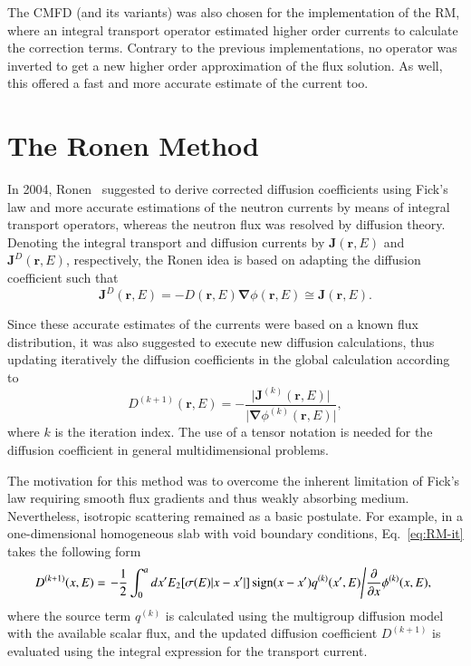 \documentclass[review,3p,onecolumn,sort&compress]{elsarticle}
\newcommand{\rr}{\bm{r}}
\newcommand{\rE}{\ensuremath{(\rr,E)}}
\newcommand{\bnabla}{\ensuremath{\bm{\nabla}}}
\begin{document}
The CMFD (and its variants) was also chosen for the implementation of the RM, where an integral transport operator estimated higher order currents to calculate the correction terms. Contrary to the previous implementations, no operator was inverted to get a new higher order approximation of the flux solution. As well, this offered a fast and more accurate estimate of the current too.


\section{The Ronen Method}
\label{sec:RM}

In 2004, Ronen~\cite{Ronen-2004} suggested to derive corrected diffusion coefficients using Fick's law and more accurate estimations of the neutron currents by means of integral transport operators, whereas the neutron flux was resolved by diffusion theory. Denoting the integral transport and diffusion currents by $\bm{J}\rE$ and $\bm{J}^D\rE$, respectively, the Ronen idea is based on adapting the diffusion coefficient such that
\begin{equation}
\label{eq:Fick}
\bm{J}^D\rE = -D\rE\bnabla\phi\rE \cong \bm{J}\rE.
\end{equation}

Since these accurate estimates of the currents were based on a known flux distribution, it was also suggested to execute new diffusion calculations, thus updating iteratively the diffusion coefficients in the global calculation according to
\begin{equation}
\label{eq:RM-it}
D^{(k+1)}\rE = - \frac{\lvert \bm{J}^{(k)}\rE \rvert}{\lvert \bnabla \phi^{(k)}\rE \rvert},
\end{equation}
where $k$ is the iteration index. The use of a tensor notation is needed for the diffusion coefficient in general multidimensional problems.

The motivation for this method was to overcome the inherent limitation of Fick's law requiring smooth flux gradients and thus weakly absorbing medium. Nevertheless, isotropic scattering remained as a basic postulate. For example, in a one-dimensional homogeneous slab with void boundary conditions, Eq.~\eqref{eq:RM-it} takes the following form~\cite{Ronen-2004}
\begin{equation}
\label{eq:RM-it-1D-slab}
D^{(k+1)}(x,E) = \left. -\frac{1}{2} \int_0^a dx'
{E_2[\sigma(E) \lvert x-x' \rvert]\operatorname{sign}(x-x')q^{(k)}(x',E)}
\middle/ \frac{\partial}{\partial x}\phi^{(k)}(x,E),\right.
\end{equation}
where the source term $q^{(k)}$ is calculated using the multigroup diffusion model with the available scalar flux, and the updated diffusion coefficient $D^{(k+1)}$ is evaluated using the integral expression for the transport current.
\end{document}
